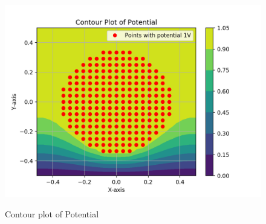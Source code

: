 \documentclass[11pt, a4paper]{article}
\begin{document}
\begin{figure}[H]
   	\centering
   	\includegraphics[scale=0.5]{cont_potl_f.png}
   	\label{fig:cont_potl_f}
   	\caption{Contour plot of Potential}
\end{figure}
\end{document}
